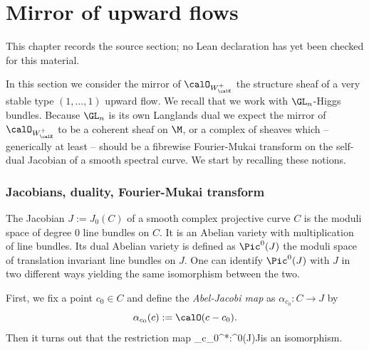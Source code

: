 \chapter{Mirror of  upward flows}
\label{very-stable-higgs-bundles-equivariant-multiplicity-mirror-symmetry-chapter-06}

\begin{remark}
\label{very-stable-higgs-bundles-equivariant-multiplicity-mirror-symmetry-chapter-06-source}
This chapter records the source section; no Lean declaration has yet been checked for this material.
\notready
\end{remark}

\label{mirror}

In this section we consider the mirror of $\calO_{W^+_\calE}$ the structure sheaf of a very stable type $(1,...,1)$ upward flow. We recall that we work with $\GL_n$-Higgs bundles. Because $\GL_n$ is its own Langlands dual we expect the mirror of $\calO_{W^+_\calE}$ to be a coherent sheaf on $\M$, or a complex of sheaves which -- generically at least -- should be a fibrewise Fourier-Mukai transform on the self-dual Jacobian of a smooth spectral curve. We start by recalling these notions.
\subsection{Jacobians, duality, Fourier-Mukai transform}
The Jacobian $J:=J_0(C)$ of a smooth complex projective curve $C$ is the moduli space of degree $0$ line bundles on $C$. It is an Abelian variety with multiplication of line bundles. %
Its dual Abelian variety is defined as $\Pic^0(J)$ the moduli space of translation invariant line bundles on $J$. One can identify $\Pic^0(J)$ with $J$ in two different ways yielding the same isomorphism between the two.

First, we fix a point $c_0\in C$ and define the {\em Abel-Jacobi map} as $\alpha_{c_0}:C\to J$ by $$\alpha_{c_0}(c):=\calO(c-c_0).$$ Then it turns out \cite[Lemma 11.3.1]{birkenhake-lange} that the  restriction map \beq\label{ajiso} \alpha_{c_0}^*:\Pic^0(J)\to J\eeq is an isomorphism.

